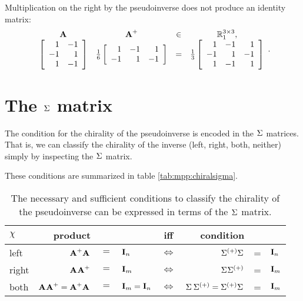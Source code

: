 %
Multiplication on the right by the pseudoinverse does not produce an identity matrix:
\begin{equation*}
  \begin{array}{cccc}
  \A{}&\Ap&\in&\real{\by{3}{3}}_{1},\\
  \Aexample &
  \frac{1}{6}\mat{rrr}{1&-1&1\\-1&1&-1}
   & = &
  \frac{1}{3}
  \mat{rrr}{1&-1&1\\-1&1&-1\\1&-1&1}
  \end{array}.
\end{equation*}

\section{The $\sig{}$ matrix}
The condition for the chirality of the pseudoinverse is encoded in the $\sig{}$ matrices. That is, we can classify the chirality of the inverse (left, right, both, neither) simply by inspecting the $\sig{}$ matrix. 

These conditions are summarized in table \eqref{tab:mpp:chiralsigma}.
\begin{table}[htdp]
\begin{center}
%
\begin{tabular}{lrclcrcl}
    $\chi$  & product  && & iff & condition \\\hline
    left  & $\leftinv$  &$=$& $\I{n}$ & $\iff$ & $\sig{(+)}\sig{}$ &=& $\I{n}$\\
    right & $\rightinv$ &$=$& $\I{m}$ & $\iff$ & $\sig{}\sig{(+)}$ &=& $\I{m}$\\
    both  & $\rightinv = \leftinv$ &$=$& $\I{m}=\I{n}$ & $\iff$ & $\sig{}\,\sig{(+)}=\sig{(+)}\sig{}$ &=& $\I{m}$\\[5pt]
\end{tabular}
%
\end{center}
\label{tab:mpp:chiralsigma}
\caption{The necessary and sufficient conditions to classify the chirality of the pseudoinverse can be expressed in terms of the $\sig{}$ matrix.}
\end{table}%

